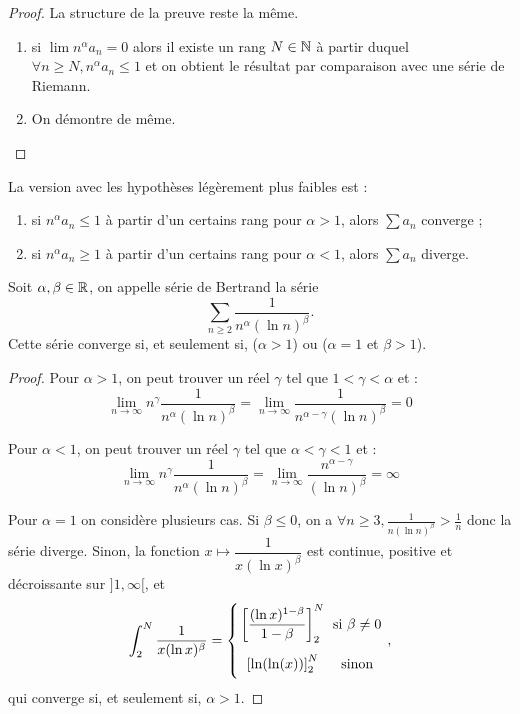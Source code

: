 \documentclass[french]{article}
\begin{document}
\begin{proof}
La structure de la preuve reste la même.
\begin{enumerate}[label=(\roman*)]
\item si $\lim n^{\alpha} a_n = 0$ alors il existe un rang $N \in \mathbb{N}$ à partir duquel $\forall n \geq N, n^{\alpha} a_n \leq 1$ 
et on obtient le résultat par comparaison avec une série de Riemann.
\item On démontre de même.
\end{enumerate}
\end{proof}

\begin{rmq}
La version avec les hypothèses légèrement plus faibles est :
\begin{enumerate}[label=(\roman*)]
\item si $n^{\alpha} a_n \leq 1$ à partir d'un certains rang pour $\alpha > 1$, alors $\sum a_n$ converge ;
\item si $n^{\alpha} a_n \geq 1$ à partir d'un certains rang pour $\alpha < 1$, alors $\sum a_n$ diverge.
\end{enumerate}
\end{rmq}

\begin{thm}
Soit $\alpha, \beta \in \mathbb{R}$, on appelle série de Bertrand la série 
\[ \sum_{n \geq 2} \dfrac{1}{n^{\alpha}(\ln{n})^{\beta}} . \]
Cette série converge si, et seulement si, ($\alpha > 1$) ou ($\alpha = 1$ et $\beta > 1$).
\end{thm}

\begin{proof}
Pour $\alpha > 1$, on peut trouver un réel $\gamma$ tel que $1 < \gamma < \alpha$ et :
\[ \lim_{n \to \infty} n^{\gamma} \dfrac{1}{n^{\alpha}(\ln{n})^{\beta}} = 
\lim_{n \to \infty} \dfrac{1}{n^{\alpha-\gamma}(\ln{n})^{\beta}} = 0 \]

Pour $\alpha <1$, on peut trouver un réel $\gamma$ tel que $\alpha < \gamma < 1$ et :
\[ \lim_{n \to \infty} n^{\gamma} \dfrac{1}{n^{\alpha}(\ln{n})^{\beta}} = 
\lim_{n \to \infty} \dfrac{n^{\alpha-\gamma}}{(\ln{n})^{\beta}} = \infty \]

Pour $\alpha = 1$ on considère plusieurs cas.
Si $\beta \leq 0$, on a $\forall n \geq 3, \frac{1}{n(\ln{n})^{\beta}} > \frac{1}{n}$ donc la série diverge.
Sinon, la fonction $x \mapsto \dfrac{1}{x(\ln{x})^\beta}$ est continue, positive et décroissante sur $]1, \infty[$, et
\[ \arraycolsep=1.4pt\def\arraystretch{2.2}
\int_2^N \dfrac{1}{x(\ln{x})^{\beta}} = \left \{ \begin{array}{c c}
\left [ \dfrac{(\ln{x})^{1-\beta}}{1-\beta} \right ]_2^N  & \text{ si } \beta \neq 0 \\
\left [ \ln(\ln(x)) \right ]_2^N & \text{ sinon}
\end{array} \right.,  \]
qui converge si, et seulement si, $\alpha >1$.
\end{proof}
\end{document}
